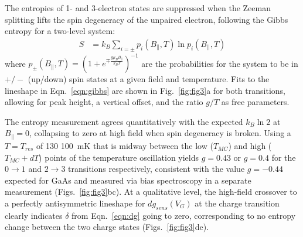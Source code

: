 \documentclass[preprint,showpacs,preprintnumbers,amsmath,amssymb,pra,aps,superscriptaddress]{revtex4-1}
\begin{document}
The entropies of 1- and 3-electron states are suppressed when the Zeeman splitting lifts the spin degeneracy of the unpaired electron, following the Gibbs entropy for a two-level system:
%
\begin{align}
\label{eqn:gibbs}
        S &= k_B \sum_{i=\pm} p_{i}(B_\parallel, T) \ln{ p_{i}(B_\parallel,T) }
\end{align}
%
where $p_{\pm}(B_\parallel, T) = (1+ e^{\mp \frac{g\mu_B B_{\parallel}}{k_B T}})^{-1}$ are the probabilities for the system to be in $+/-$ (up/down) spin states at a given field and temperature. Fits to the lineshape in Eqn.~\ref{eqn:gibbs} are shown in Fig.~\ref{fig:fig3}a for both transitions, allowing for peak height, a vertical offset, and the ratio $g/T$ as free parameters.

The entropy measurement agrees quantitatively with the expected $k_{B} \ln{2}$ at $B_\parallel=0$, collapsing to zero at high field when spin degeneracy is broken.  Using a $T=T_{res}$ of 130 \SI{100}{\milli\kelvin} that is midway between the low ($T_{MC}$) and high ($T_{MC}+dT$) points of the temperature oscillation yields $g=0.43$ or $g=0.4$ for the $0\rightarrow 1$ and $2\rightarrow 3$ transitions respectively, consistent with the value $g=-0.44$ expected for GaAs and measured via bias spectroscopy in a separate measurement (Figs.~\ref{fig:fig3}bc).  At a qualitative level, the high-field crossover to a perfectly antisymmetric lineshape for $dg_{sens}(V_G)$ at the charge transition clearly indicates $\delta$ from Eqn.~\ref{eqn:dg} going to zero, corresponding to no entropy change between the two charge states (Figs.~\ref{fig:fig3}de). 
\end{document}
